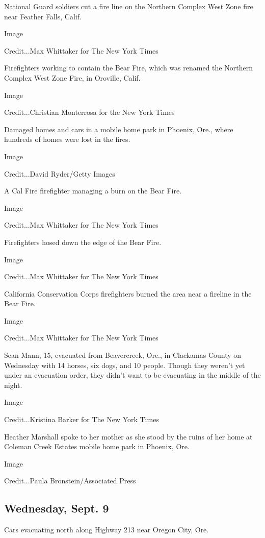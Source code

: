 National Guard soldiers cut a fire line on the Northern Complex West
Zone fire near Feather Falls, Calif.

Image

Credit...Max Whittaker for The New York Times

Firefighters working to contain the Bear Fire, which was renamed the
Northern Complex West Zone Fire, in Oroville, Calif.

Image

Credit...Christian Monterrosa for the New York Times

Damaged homes and cars in a mobile home park in Phoenix, Ore., where
hundreds of homes were lost in the fires.

Image

Credit...David Ryder/Getty Images

A Cal Fire firefighter managing a burn on the Bear Fire.

Image

Credit...Max Whittaker for The New York Times

Firefighters hosed down the edge of the Bear Fire.

Image

Credit...Max Whittaker for The New York Times

California Conservation Corps firefighters burned the area near a
fireline in the Bear Fire.

Image

Credit...Max Whittaker for The New York Times

Sean Mann, 15, evacuated from Beavercreek, Ore., in Clackamas County on
Wednesday with 14 horses, six dogs, and 10 people. Though they weren't
yet under an evacuation order, they didn't want to be evacuating in the
middle of the night.

Image

Credit...Kristina Barker for The New York Times

Heather Marshall spoke to her mother as she stood by the ruins of her
home at Coleman Creek Estates mobile home park in Phoenix, Ore.

Image

Credit...Paula Bronstein/Associated Press

\hypertarget{wednesday-sept-9}{%
\subsection{Wednesday, Sept. 9}\label{wednesday-sept-9}}

Cars evacuating north along Highway 213 near Oregon City, Ore.

